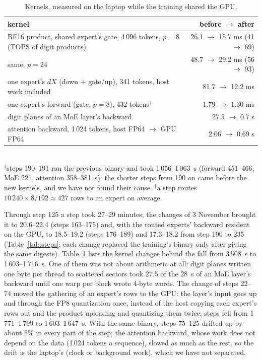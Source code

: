 \documentclass[11pt]{article}
\begin{document}
\begin{table}[t]\centering\small
\caption{Kernels, measured on the laptop while the training shared the GPU.}\label{tab:kernels}
\begin{tabular}{p{9.6cm}r}\toprule
kernel & before $\rightarrow$ after \\\midrule
BF16 product, shared expert's gate, 4\,096 tokens, $p=8$ (TOPS of digit products) & 26.1 $\rightarrow$ 15.7 ms (41 $\rightarrow$ 69) \\
same, $p=24$ & 48.7 $\rightarrow$ 29.2 ms (56 $\rightarrow$ 93) \\
one expert's $dX$ (down + gate/up), 341 tokens, host work included & 81.7 $\rightarrow$ 12.2 ms \\
one expert's forward (gate, $p=8$), 432 tokens$^{\dagger}$ & 1.79 $\rightarrow$ 1.30 ms \\
digit planes of an MoE layer's backward & 27.5 $\rightarrow$ 0.7 s \\
attention backward, 1\,024 tokens, host FP64 $\rightarrow$ GPU FP64 & 2.06 $\rightarrow$ 0.69 s \\\bottomrule
\end{tabular}\\[2pt]
{\footnotesize $^{\ddagger}$steps 190--191 ran the previous binary and took 1\,056--1\,063~s (forward 451--466, MoE 221, attention 358--381~s): the shorter steps from 190 on came before the new kernels, and we have not found their cause.}
{\footnotesize $^{\dagger}$a step routes $10\,240\times8/192\approx427$ rows to an expert on average.}
\end{table}

Through step 125 a step took 27--29 minutes; the changes of 3 November brought it to 20.6--22.4 (steps 163--175) and,
with the routed experts' backward resident on the GPU, to 18.5--19.2 (steps 176--189) and 17.3--18.2 from step 190 to 235 (Table~\ref{tab:steps};
each change replaced the training's binary only after giving the same digests). Table~\ref{tab:kernels} lists the kernel
changes behind the fall from 3\,508~s to 1\,603--1\,716~s. One of them was not about arithmetic at all: digit planes written one byte per thread to scattered sectors took
27.5 of the 28~s of an MoE layer's backward until one warp per block wrote 4-byte words. The change of steps 22--74 moved the gathering
of an expert's rows to the GPU: the layer's input goes up and through the FP8 quantization once, instead of the host copying
each expert's rows out and the product uploading and quantizing them twice; steps fell from 1\,771--1\,799 to 1\,603--1\,647~s.
With the same binary, steps 75--125 drifted up by about 5\% in every part of the step; the attention backward, whose work
does not depend on the data (1\,024 tokens a sequence), slowed as much as the rest, so the drift is the laptop's (clock or
background work), which we have not separated.
\end{document}
